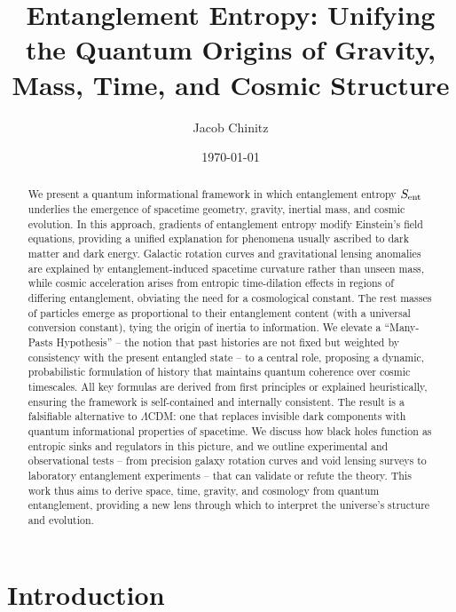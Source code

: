 \documentclass[11pt]{article}
\author{Jacob Chinitz}
\title{Entanglement Entropy: Unifying the Quantum Origins of Gravity, Mass, Time, and Cosmic Structure}
\date{\today}
\begin{document}
\maketitle

\begin{abstract}
 We present a quantum informational framework in which entanglement entropy $S_{\rm ent}$ underlies the emergence of spacetime geometry, gravity, inertial mass, and cosmic evolution. In this approach, gradients of entanglement entropy modify Einstein’s field equations, providing a unified explanation for phenomena usually ascribed to dark matter and dark energy. Galactic rotation curves and gravitational lensing anomalies are explained by entanglement-induced spacetime curvature rather than unseen mass, while cosmic acceleration arises from entropic time-dilation effects in regions of differing entanglement, obviating the need for a cosmological constant. The rest masses of particles emerge as proportional to their entanglement content (with a universal conversion constant), tying the origin of inertia to information. We elevate a “Many-Pasts Hypothesis” – the notion that past histories are not fixed but weighted by consistency with the present entangled state – to a central role, proposing a dynamic, probabilistic formulation of history that maintains quantum coherence over cosmic timescales. All key formulas are derived from first principles or explained heuristically, ensuring the framework is self-contained and internally consistent. The result is a falsifiable alternative to $\Lambda$CDM: one that replaces invisible dark components with quantum informational properties of spacetime. We discuss how black holes function as entropic sinks and regulators in this picture, and we outline experimental and observational tests – from precision galaxy rotation curves and void lensing surveys to laboratory entanglement experiments – that can validate or refute the theory. This work thus aims to derive space, time, gravity, and cosmology from quantum entanglement, providing a new lens through which to interpret the universe’s structure and evolution.
\end{abstract}

\section{Introduction}
\end{document}
